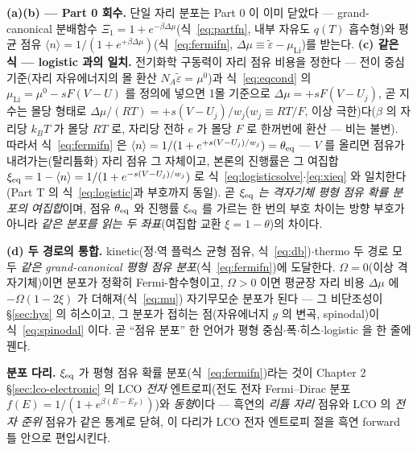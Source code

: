 \textbf{(a)(b) --- Part 0 회수.} 단일 자리 분포는 Part 0 이 이미 닫았다 --- grand-canonical
분배함수 $\Xi_1=1+e^{-\beta\Delta\mu}$(식~\eqref{eq:partfn}, 내부 자유도 $q(T)$ 흡수형)와 평균 점유
$\langle n\rangle=1/(1+e^{+\beta\Delta\mu})$(식~\eqref{eq:fermifn},
$\Delta\mu\equiv\tilde\varepsilon-\mu_\mathrm{Li}$)를 받는다. \textbf{(c) 같은 식 --- logistic 과의 일치.}
전기화학 구동력이 자리 점유 비용을 정한다 --- 전이 중심 기준(자리 자유에너지의 몰 환산 $N_A\tilde\varepsilon=\mu^0$)과
식~\eqref{eq:eqcond} 의 $\mu_\mathrm{Li}=\mu^0-sF(V-U)$ 를 정의에 넣으면 1몰 기준으로
$\Delta\mu=+sF(V-U_j)$, 곧 지수는 몰당 형태로
$\Delta\mu/(RT)=+s(V-U_j)/w_j$($w_j\equiv RT/F$, 이상 극한)다($\beta$ 의 자리당 $k_BT$ 가 몰당 $RT$ 로,
자리당 전하 $e$ 가 몰당 $F$ 로 한꺼번에 환산 --- 비는 불변). 따라서 식~\eqref{eq:fermifn} 은
$\langle n\rangle=1/(1+e^{+s(V-U_j)/w_j})=\theta_{\mathrm{eq}}$ --- $V$ 를 올리면 점유가 내려가는(탈리튬화) 자리 점유
그 자체이고, 본론의 진행률은 그 여집합 $\xi_{\mathrm{eq}}=1-\langle n\rangle=1/(1+e^{-s(V-U_j)/w_j})$ 로
식~\eqref{eq:logisticsolve}$\cdot$\eqref{eq:xieq} 와 일치한다(Part T 의 식~\eqref{eq:logistic}과 부호까지 동일).
곧 \emph{$\xi_{\mathrm{eq}}$ 는 격자기체 평형 점유 확률 분포의 여집합}이며, 점유 $\theta_{\mathrm{eq}}$ 와 진행률 $\xi_{\mathrm{eq}}$ 를
가르는 한 번의 부호 차이는 방향 부호가 아니라 \emph{같은 분포를 읽는 두 좌표}(여집합 교환
$\xi=1-\theta$)의 차이다.

\textbf{(d) 두 경로의 통합.} kinetic(정$\cdot$역 플럭스 균형 점유, 식~\eqref{eq:db})$\cdot$thermo 두 경로
모두 \emph{같은 grand-canonical 평형 점유 분포}(식~\eqref{eq:fermifn})에 도달한다. $\Omega=0$(이상 격자기체)이면 분포가 정확히 Fermi-함수형이고, $\Omega>0$
이면 평균장 자리 비용 $\Delta\mu$ 에 $-\Omega(1-2\xi)$ 가 더해져(식~\eqref{eq:mu}) 자기무모순 분포가 된다 --- 그
비단조성이 \S\ref{sec:hys} 의 히스이고, 그 분포가 접히는 점(자유에너지 $g$ 의 변곡, spinodal)이 식~\eqref{eq:spinodal} 이다. 곧 ``점유 분포''
한 언어가 평형 중심$\cdot$폭$\cdot$히스$\cdot$logistic 을 한 줄에 꿴다.

\begin{keybox}
\textbf{분포 다리.} $\xi_{\mathrm{eq}}$ 가 평형 점유 확률 분포(식~\eqref{eq:fermifn})라는 것이 Chapter 2 \S\ref{sec:lco-electronic}
의 LCO \emph{전자} 엔트로피(전도 전자 Fermi--Dirac 분포 $f(E)=1/(1+e^{\beta(E-E_F)})$)와 \emph{동형}이다 ---
흑연의 \emph{리튬 자리} 점유와 LCO 의 \emph{전자 준위} 점유가 같은 통계로 닫혀, 이 다리가 LCO 전자 엔트로피
절을 흑연 forward 틀 안으로 편입시킨다.
\end{keybox}

